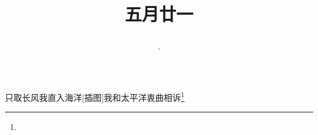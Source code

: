 \title{\date[d=26,m=6,y=2024][year:cn-y,年,month:cn,day:cn,日,·,weekday]·五月廿一 }
只取长风我直入海洋[插图]我和太平洋衷曲相诉\footnote{ }


